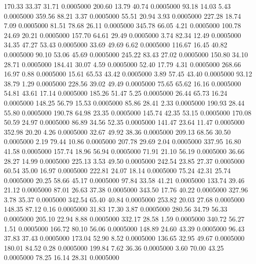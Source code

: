  170.33   33.37   31.71   0.0005000
 200.60   13.79   40.74   0.0005000
  93.18   14.03    5.43   0.0005000
 359.56   88.21    3.37   0.0005000
  55.51   20.94    3.93   0.0005000
 227.28   18.74    7.09   0.0005000
  81.51   78.68   26.11   0.0005000
 345.78   66.05    4.21   0.0005000
 100.78   24.69   20.21   0.0005000
 157.70   64.61   29.49   0.0005000
   3.74   82.34   12.49   0.0005000
  34.35   47.27   53.43   0.0005000
  33.69   49.69    6.62   0.0005000
 116.67   16.45   40.82   0.0005000
  90.10   53.06   45.69   0.0005000
 245.22   83.43   27.02   0.0005000
 150.80   34.10   28.71   0.0005000
 184.41   30.07    4.59   0.0005000
  52.40   17.79    4.31   0.0005000
 268.66   16.97    0.88   0.0005000
  15.61   65.53   43.42   0.0005000
   3.89   57.45   43.40   0.0005000
  93.12   38.79    1.29   0.0005000
 228.56   39.02   49.49   0.0005000
  75.65   65.62   16.16   0.0005000
  54.81   43.61   17.14   0.0005000
 185.26   51.47    5.25   0.0005000
  26.44   65.73   16.24   0.0005000
 148.25   56.79   15.53   0.0005000
  85.86   28.41    2.33   0.0005000
 190.93   28.44   55.80   0.0005000
 190.78   64.98   23.35   0.0005000
 145.74   42.35   53.15   0.0005000
 170.08   50.59   24.97   0.0005000
  86.89   34.56   52.35   0.0005000
 141.47   23.64   11.47   0.0005000
 352.98   20.20    4.26   0.0005000
  32.67   49.92   38.36   0.0005000
 209.13   68.56   30.50   0.0005000
   2.19   79.44   10.86   0.0005000
 207.78   29.69    2.04   0.0005000
 337.95   16.80   41.58   0.0005000
 157.74   18.96   56.94   0.0005000
  71.91   21.10   56.19   0.0005000
  36.66   28.27   14.99   0.0005000
 225.13    3.53   49.50   0.0005000
 242.54   23.85   27.37   0.0005000
  60.54   35.00   16.97   0.0005000
 222.81   24.07   18.14   0.0005000
  75.24   42.31   25.74   0.0005000
  20.25   58.66   45.17   0.0005000
  97.84   33.58   41.21   0.0005000
 133.74   39.46   21.12   0.0005000
  87.01   26.63   37.38   0.0005000
 343.50   17.76   40.22   0.0005000
 327.96    3.78   35.37   0.0005000
 342.54   65.40   40.84   0.0005000
 253.82   20.03   27.68   0.0005000
 148.35   87.12    0.16   0.0005000
  31.83   17.30    3.87   0.0005000
 280.56   34.79   56.33   0.0005000
 205.10   22.94    8.88   0.0005000
 332.17   28.58    1.59   0.0005000
 340.72   56.27    1.51   0.0005000
 166.72   80.10   56.06   0.0005000
 148.89   24.60   43.39   0.0005000
  96.43   37.83   37.43   0.0005000
 173.04   52.90    8.52   0.0005000
 136.65   32.95   49.67   0.0005000
 180.01   84.52    0.28   0.0005000
 199.84    7.62   36.36   0.0005000
   3.60   70.00   43.25   0.0005000
  78.25   16.14   28.31   0.0005000
